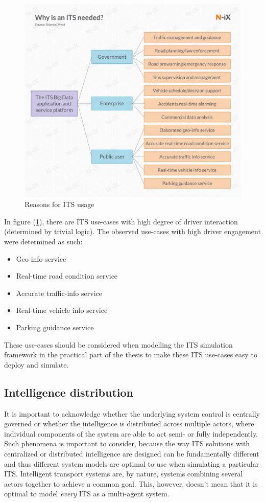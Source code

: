 \documentclass[main.tex]{subfiles}
\begin{document}
\begin{figure}[htbp]
    \centering
    \includegraphics[width=.8\textwidth]{why is ITS needed.jpg}
    \caption{Reasons for ITS usage \cite{Lishchenko2021}}
    \label{whyITS}
\end{figure}

In figure (\ref{whyITS}), there are ITS use-cases with high degree of driver interaction (determined 
by trivial logic). The observed use-cases with high driver engagement were determined as such:

\begin{itemize}
    \item Geo-info service
    \item Real-time road condition service 
    \item Accurate traffic-info service 
    \item Real-time vehicle info service 
    \item Parking guidance service
\end{itemize}

These use-cases should be considered when modelling the ITS simulation framework in the practical part of the 
thesis to make these ITS use-cases easy to deploy and simulate.

\subsection{Intelligence distribution} \label{mas-compatibility}

It is important to acknowledge whether the underlying system control is centrally governed 
or whether the intelligence is distributed across multiple actors, where individual 
components of the system are able to act semi- or fully independently.
Such phenomena is important to consider, because the way ITS solutions 
with centralized or distributed intelligence are designed can be fundamentally different 
and thus different system models are optimal to use when simulating a particular ITS. 
Intelligent transport systems are, by nature, systems combining several actors together to
achieve a common goal. This, however, doesn't mean that it is optimal to model \emph{every} ITS 
as a multi-agent system. 
\end{document}

